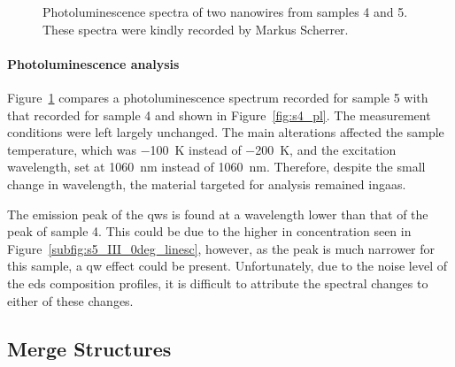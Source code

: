 \begin{figure}
    \centering
    \caption{Photoluminescence spectra of two nanowires from samples 4 and 5. These spectra were kindly recorded by Markus Scherrer.}
    \label{fig:s5_pl}
\end{figure}

\paragraph{Photoluminescence analysis} Figure~\ref{fig:s5_pl} compares a photoluminescence spectrum recorded for sample 5 with that recorded for sample 4 and shown in Figure~\ref{fig:s4_pl}. The measurement conditions were left largely unchanged. The main alterations affected the sample temperature, which was \qty{-100}{\kelvin} instead of \qty{-200}{\kelvin}, and the excitation wavelength, set at \qty{1060}{\nano\metre} instead of \qty{1060}{\nano\metre}. Therefore, despite the small change in wavelength, the material targeted for analysis remained \acs{ingaas}.

The emission peak of the \acl{qw}s is found at a wavelength lower than that of the peak of sample 4. This could be due to the higher \acl{in} concentration seen in Figure~\ref{subfig:s5_III_0deg_linesc}, however, as the peak is much narrower for this sample, a \acl{qw} effect could be present. Unfortunately, due to the noise level of the \acs{eds} composition profiles, it is difficult to attribute the spectral changes to either of these changes.
\par

\subsection{Merge Structures}

